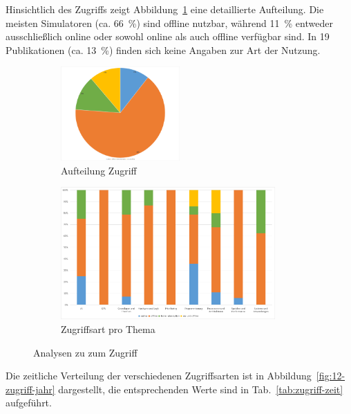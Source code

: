 Hinsichtlich des Zugriffs zeigt Abbildung~\ref{fig:11-zugriff} eine detaillierte Aufteilung. Die meisten Simulatoren (ca. 66~\%) sind offline nutzbar, während 11~\% entweder ausschließlich online oder sowohl online als auch offline verfügbar sind. In 19 Publikationen (ca. 13~\%) finden sich keine Angaben zur Art der Nutzung.

\begin{figure}[!htbp]
    \centering
    \begin{subfigure}[b]{0.48\textwidth}
        \centering
        \includegraphics[width=0.5\textwidth]{graphics/11-zugriff2.png}
        \caption{Aufteilung Zugriff}
        \label{fig:11-zugriff}
    \end{subfigure}
    \hfill
    \begin{subfigure}[b]{0.48\textwidth}
        \centering
        \includegraphics[width=0.90\textwidth]{graphics/13-zugriff-thema.png}
        \caption{Zugriffsart pro Thema}
        \label{fig:13-zugriff-thema}
    \end{subfigure}
    \caption{Analysen zu zum Zugriff}
    \label{fig:zugriff-analysen}
\end{figure}

Die zeitliche Verteilung der verschiedenen Zugriffsarten ist in Abbildung~\ref{fig:12-zugriff-jahr} dargestellt, die entsprechenden Werte sind in Tab.~\ref{tab:zugriff-zeit} aufgeführt.

